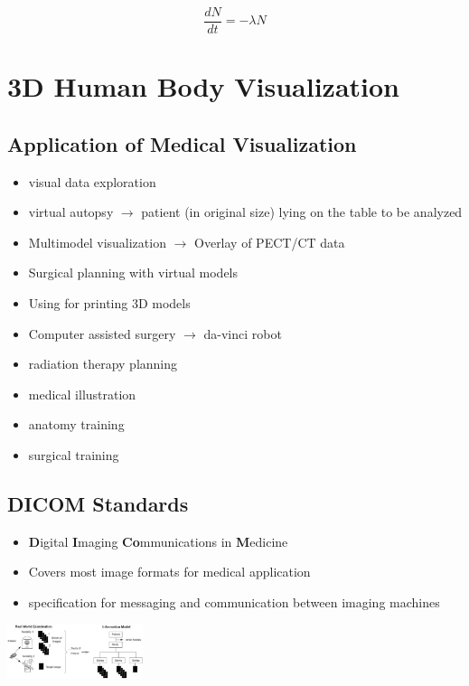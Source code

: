 \documentclass{report}
\newenvironment{Figure}
	{\par\medskip\noindent\minipage{\linewidth}}
	{\endminipage\par\medskip}
\theoremstyle{definition}
\theoremstyle{example}
\begin{document}
\begin{equation}
   \frac{dN}{dt} = - \lambda N
\end{equation}


\chapter{3D Human Body Visualization}

\section{Application of Medical Visualization}
\begin{itemize}
   \item visual data exploration
   \item virtual autopsy $\rightarrow$ patient (in original size) lying on the table to be analyzed
   \item Multimodel visualization $\rightarrow$ Overlay of PECT/CT data
   \item Surgical planning with virtual models
   \item Using for printing 3D models
   \item Computer assisted surgery $\rightarrow$ da-vinci robot
   \item radiation therapy planning
   \item medical illustration
   \item anatomy training
   \item surgical training
\end{itemize}

\section{DICOM Standards}
\begin{itemize}
   \item \textbf{D}igital \textbf{I}maging \textbf{Co}mmunications in \textbf{M}edicine
   \item Covers most image formats for medical application
   \item specification for messaging and communication between imaging machines 
\end{itemize}

\begin{Figure}
   \centering
    \includegraphics[width=150px]{img/DICOM.png}
        \label{fig:DICOM Information Model}
\end{Figure}
\end{document}
